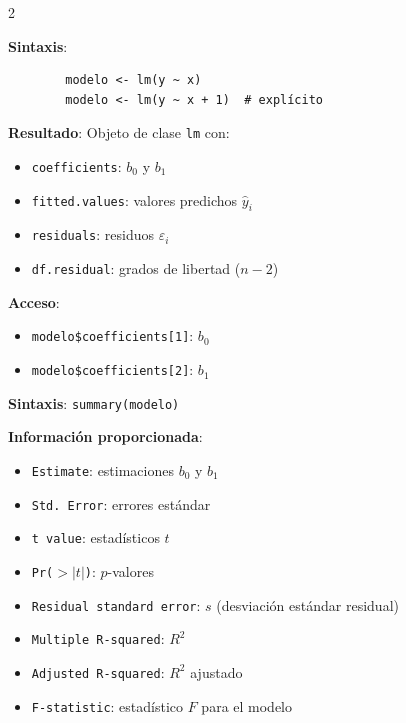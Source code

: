 \documentclass[10pt,a4paper]{article}
\begin{document}
\begin{multicols}{2}
    \begin{tcolorbox}[title=lm(): Ajuste del Modelo, equal height group=RL4]
        \textbf{Sintaxis}:
        \begin{verbatim}
        modelo <- lm(y ~ x)
        modelo <- lm(y ~ x + 1)  # explícito
        \end{verbatim}
        
        \textbf{Resultado}: Objeto de clase \texttt{lm} con:
        \begin{itemize}
            \item \texttt{coefficients}: $b_0$ y $b_1$
            \item \texttt{fitted.values}: valores predichos $\hat{y}_i$
            \item \texttt{residuals}: residuos $\varepsilon_i$
            \item \texttt{df.residual}: grados de libertad ($n-2$)
        \end{itemize}
        
        \textbf{Acceso}:
        \begin{itemize}
            \item \texttt{modelo\$coefficients[1]}: $b_0$
            \item \texttt{modelo\$coefficients[2]}: $b_1$
        \end{itemize}
    \end{tcolorbox}
    \begin{tcolorbox}[title=summary(): Resumen del Modelo, equal height group=RL4]
        \textbf{Sintaxis}: \texttt{summary(modelo)}
        
        \textbf{Información proporcionada}:
        \begin{itemize}
            \item \texttt{Estimate}: estimaciones $b_0$ y $b_1$
            \item \texttt{Std. Error}: errores estándar
            \item \texttt{t value}: estadísticos $t$
            \item \texttt{Pr($>|t|$)}: $p$-valores
            \item \texttt{Residual standard error}: $s$ (desviación estándar residual)
            \item \texttt{Multiple R-squared}: $R^2$
            \item \texttt{Adjusted R-squared}: $R^2$ ajustado
            \item \texttt{F-statistic}: estadístico $F$ para el modelo
        \end{itemize}
    \end{tcolorbox}
\end{multicols}
\end{document}
